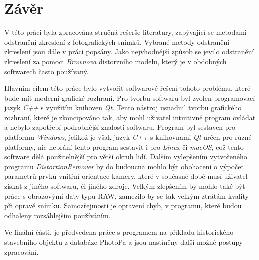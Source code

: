 \chapter{Závěr}
\label{chap:zaver}

		V této práci byla zpracována stručná rešerše literatury, zabývající se metodami odstranění zkreslení z fotografických snímků. Vybrané metody odstranění zkreslení jsou dále v práci popsány. Jako nejvhodnější způsob se jevilo odstranění zkreslení za pomoci \textit{Brownova} distorzního modelu, který je v obdobných softwarech často používaný.
	
	Hlavním cílem této práce bylo vytvořit softwarové řešení tohoto problému, které bude mít moderní grafické rozhraní. Pro tvorbu softwaru byl zvolen programovací jazyk \textit{C++} s využitím knihoven \textit{Qt}. Tento nástroj usnadnil tvorbu grafického rozhraní, které je zkoncipováno tak, aby mohl uživatel intuitivně program ovládat a nebylo zapotřebí podrobnější znalosti softwaru. Program byl sestaven pro platformu \textit{Windows}, jelikož je však jazyk \textit{C++} s knihovnami \textit{Qt} určen pro různé platformy, nic nebrání tento program sestavit i pro \textit{Linux} či \textit{macOS}, což tento software dělá použitelnější pro větší okruh lidí. Dalším vylepšením vytvořeného programu \textit{DistortionRemover} by do budoucna mohlo být obohacení o výpočet parametrů prvků vnitřní orientace kamery, které v současné době musí uživatel získat z jiného softwaru, či jiného zdroje. Velkým zlepšením by mohlo také být práce s obrazovými daty typu RAW, zamezilo by se tak velkým ztrátám kvality při opravě snímku. Samozřejmostí je opravení chyb, v programu, které budou odhaleny rozsáhlejším používáním. 
		
	Ve finální části, je předvedena práce s programem na příkladu historického stavebního objektu z databáze PhotoPa a jsou nastíněny další možné postupy zpracování.

	

